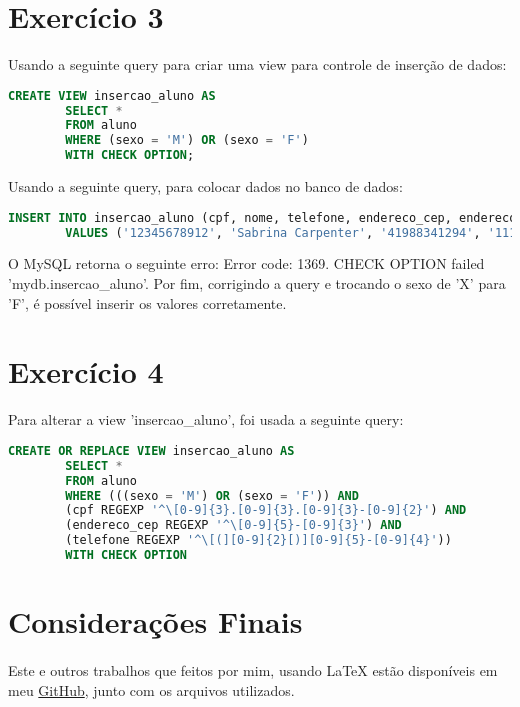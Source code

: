 \documentclass{article}
\begin{document}
\section*{Exercício 3}
Usando a seguinte query para criar uma view para controle de inserção de dados:

    \begin{lstlisting}[language=SQL]
        CREATE VIEW insercao_aluno AS
        SELECT *
        FROM aluno
        WHERE (sexo = 'M') OR (sexo = 'F')
        WITH CHECK OPTION;
    \end{lstlisting}

Usando a seguinte query, para colocar dados no banco de dados:

    \begin{lstlisting}[language=SQL]
        INSERT INTO insercao_aluno (cpf, nome, telefone, endereco_cep, endereco_num, sexo)
        VALUES ('12345678912', 'Sabrina Carpenter', '41988341294', '11111111', 42, 'X')
    \end{lstlisting}

O MySQL retorna o seguinte erro: Error code: 1369. CHECK OPTION failed 'mydb.insercao\_aluno'. Por fim, corrigindo a query e trocando o sexo de 'X' para 'F', é possível inserir os valores corretamente.

\section*{Exercício 4}
Para alterar a view 'insercao\_aluno', foi usada a seguinte query:

    \begin{lstlisting}[language=SQL]
        CREATE OR REPLACE VIEW insercao_aluno AS
        SELECT *
        FROM aluno
        WHERE (((sexo = 'M') OR (sexo = 'F')) AND 
        (cpf REGEXP '^\[0-9]{3}.[0-9]{3}.[0-9]{3}-[0-9]{2}') AND 
        (endereco_cep REGEXP '^\[0-9]{5}-[0-9]{3}') AND
        (telefone REGEXP '^\[(][0-9]{2}[)][0-9]{5}-[0-9]{4}'))
        WITH CHECK OPTION
    \end{lstlisting}

\section*{Considerações Finais}
\paragraph{}Este e outros trabalhos que feitos por mim, usando \LaTeX{} estão disponíveis em meu \href{https://github.com/gpgp2006/LaTeX}{GitHub}, junto com os arquivos utilizados.
\end{document}
